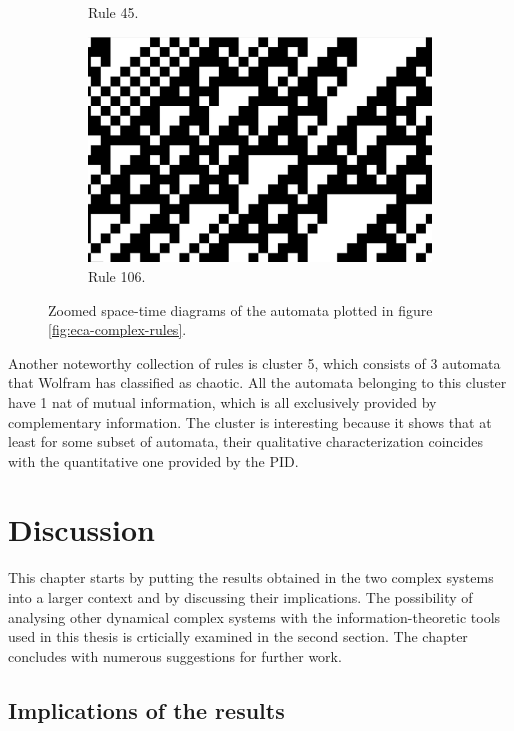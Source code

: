 \documentclass[12pt]{article}
\begin{document}
\begin{figure} [h]
\begin{subfigure}{.5\textwidth}
  \caption{Rule 45.}
  \label{fig:rule45-zoomed}
\end{subfigure}
\begin{subfigure}{.5\textwidth}
  \centering
  \includegraphics[width=.9\linewidth]{rule106-zoomed}
  \caption{Rule 106.}
  \label{fig:rule106-zoomed}
\end{subfigure}
\caption{Zoomed space-time diagrams of the automata plotted in figure \ref{fig:eca-complex-rules}.}
\label{fig:eca-complex-rules-zoomed}
\end{figure}

Another noteworthy collection of rules is cluster 5, which consists  of 3 automata that Wolfram has classified as chaotic. All the automata belonging to this cluster have 1 nat of mutual information, which is all exclusively provided by complementary information. The cluster is interesting because it shows that at least for some subset of automata, their qualitative characterization coincides with the quantitative one provided by the PID. 

\newpage
\section{Discussion}

This chapter starts by putting the results obtained in the two complex systems into a larger context and by discussing their implications. The possibility of analysing other dynamical complex systems with the information-theoretic tools used in this thesis is crticially examined in the second section. The chapter concludes with numerous suggestions for further work. 

\subsection{Implications of the results}
\end{document}
